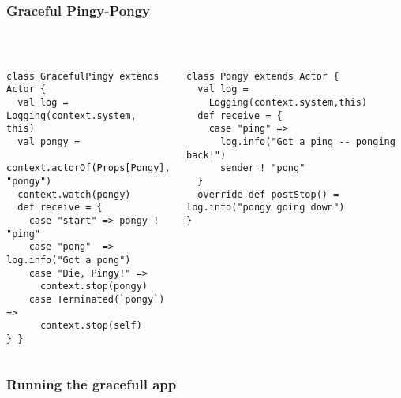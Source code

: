 \documentclass[aspectratio=169]{beamer}
\begin{document}
\begin{frame}[fragile]\frametitle{Graceful Pingy-Pongy}
~\\[-6mm]
\begin{columns}[t]
\begin{column}{0.56\textwidth}
\begin{lstlisting}[emph={Actor, Logging, Props, ourSystem,terminate,sleep,actorOf,receive, watch,stop,Terminated}]
class GracefulPingy extends Actor {
  val log = Logging(context.system, this)
  val pongy =
    context.actorOf(Props[Pongy], "pongy")
  context.watch(pongy)
  def receive = {
    case "start" => pongy ! "ping"
    case "pong"  => log.info("Got a pong")
    case "Die, Pingy!" =>
      context.stop(pongy)
    case Terminated(`pongy`) =>
      context.stop(self)
} }
\end{lstlisting}
\end{column}
\begin{column}{0.44\textwidth}
\begin{lstlisting}[emph={Actor, Logging, Props, ourSystem,terminate,sleep,actorOf,receive,become,stop}]
class Pongy extends Actor {
  val log =
    Logging(context.system,this)
  def receive = {
    case "ping" =>
      log.info("Got a ping -- ponging back!")
      sender ! "pong"
  }
  override def postStop() = log.info("pongy going down")
}
\end{lstlisting}
\end{column}
\end{columns}
\end{frame}

\begin{frame}[fragile]\frametitle{Running the gracefull app}
\centering
{}

\end{frame}
\end{document}
